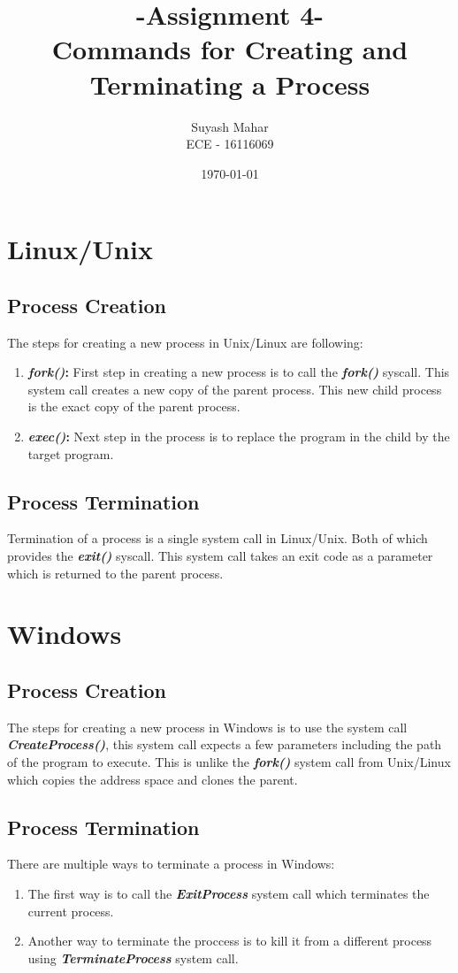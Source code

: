 \documentclass[a4,11pt]{article}
\title{-Assignment 4-\\Commands for Creating and Terminating a Process}
\author{Suyash Mahar \\
  ECE - 16116069
}
\date{\today}
\begin{document}
\maketitle


\section{Linux/Unix}

\subsection{Process Creation}
The steps for creating a new process in Unix/Linux are following:
\begin{enumerate}
\item \textbf{\textit{fork()}:} First step in creating a new process is to
  call the \textbf{\textit{fork()}} syscall. This system call creates a new
  copy of the parent process. This new child process is the exact
  copy of the parent process.
\item \textbf{\textit{exec()}:} Next step in the process is to replace the
  program in the child by the target program.
\end{enumerate}

\subsection{Process Termination}
Termination of a process is a single system call in Linux/Unix. Both of which provides the \textbf{\textit{exit()}} syscall. This system call takes an exit code as a parameter which is returned to the parent process.

\section{Windows}

\subsection{Process Creation}
The steps for creating a new process in Windows is to use the system call \textbf{\textit{CreateProcess()}}, this system call expects a few parameters including the path of the program to execute. This is unlike the \textbf{\textit{fork()}} system call from Unix/Linux which copies the address space and clones the parent.

\subsection{Process Termination}
There are multiple ways to terminate a process in Windows:

\begin{enumerate}
\item The first way is to call the \textbf{\textit{ExitProcess}}
  system call which terminates the current process.
\item Another way to terminate the proccess is to kill it from a different process using \textbf{\textit{TerminateProcess}} system call. 
\end{enumerate}
\end{document}
